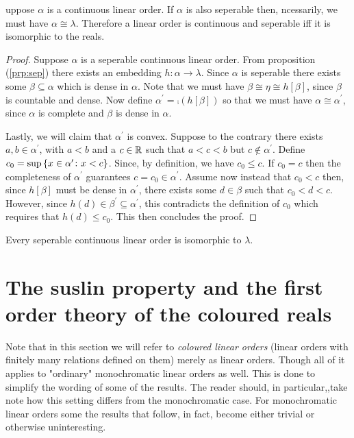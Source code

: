 	\begin{thm}
		uppose $\alpha$ is a continuous linear order.  If $\alpha$ is also seperable then, ncessarily, we must have $\alpha\cong\lambda$.  Therefore a linear order is continuous and seperable iff it is isomorphic to the reals.
	\end{thm}
	\begin{proof}
		Suppose $\alpha$ is a seperable continuous linear order.  From proposition (\ref{prp:sep}) there exists an embedding $h\colon\alpha\to\lambda$.  Since $\alpha$ is seperable there exists some $\beta\subseteq\alpha$ which is dense in $\alpha$.  Note that we must have $\beta\cong\eta\cong h[\beta]$, since $\beta$ is countable and dense.  Now define $\alpha^\prime=\comp(h[\beta])$ so that we must have $\alpha\cong\alpha^\prime$, since $\alpha$ is complete and $\beta$ is dense in $\alpha$.

		Lastly, we will claim that $\alpha^\prime$ is convex.  Suppose to the contrary there exists $a,b\in\alpha^\prime$, with $a<b$ and a $c\in\mathbb{R}$ such that $a<c<b$ but $c\notin\alpha^\prime$.  Define $c_0=\sup\left\lbrace x\in\alpha^\prime\colon x<c \right\rbrace$. Since, by definition, we have $c_0\leq c$.  If $c_0=c$ then the completeness of $\alpha^\prime$ guarantees $c=c_0\in\alpha^\prime$.  Assume now instead that $c_0<c$ then, since $h[\beta]$ must be dense in $\alpha^\prime$, there exists some $d\in\beta$ such that $c_0<d<c$.  However, since $h(d)\in\beta^\prime\subseteq\alpha^\prime$, this contradicts the definition of $c_0$ which requires that $h(d)\leq c_0$.  This then concludes the proof.
	\end{proof}

	\begin{thm}\label{thm:rchar}
		Every seperable continuous linear order is isomorphic to $\lambda$.
	\end{thm}


	\section{The  suslin property and the first order theory of the coloured reals}

	Note that in this section we will refer to \textit{coloured linear orders} (linear orders with finitely many relations defined on them) merely as linear orders.  Though all of it applies to "ordinary" monochromatic linear orders as well.  This is done to simplify the wording of some of the results.  The reader should, in particular,,take note how this setting differs from the monochromatic case.  For monochromatic linear orders some the results that follow, in fact, become either trivial or otherwise uninteresting.

